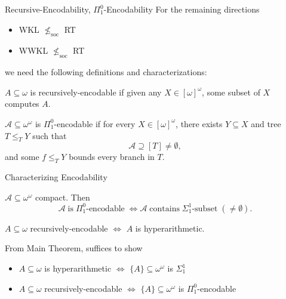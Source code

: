 \begin{frame}{Recursive-Encodability, $\Pi_1^0$-Encodability}
  For the remaining directions
  \begin{itemize}
    \item WKL $\nleq_{\text{soc}}$ RT
    \item WWKL $\nleq_{\text{soc}}$ RT
  \end{itemize}
  we need the following definitions and characterizations:

  \begin{define}
    $A\subseteq\omega$ is recursively-encodable if given any
    $X\in[\omega]^\omega$, some subset of $X$ computes $A$.
  \end{define}

  \begin{define}
    $\mathcal{A}\subseteq \omega^{\omega}$ is $\Pi_1^0$-encodable if for
    every $X\in[\omega]^\omega$, there exists $Y\subseteq X$ and tree
    $T\leq_T Y$ such that
    \[\mathcal{A} \supseteq [T]\neq\emptyset,\]
    and some $f\leq_T Y$ bounds every branch in $T$.
  \end{define}
\end{frame}

\begin{frame}{Characterizing Encodability}
  \begin{main-thm*}
    $\mathcal{A}\subseteq \omega^{\omega}$ compact. Then
    \[\mathcal{A}\; \text{is}\; \Pi_1^0\text{-encodable}\; \Leftrightarrow
    \mathcal{A}\; \text{contains}\; \Sigma_1^1\text{-subset}\;
    (\neq\emptyset).\]
  \end{main-thm*}

  \begin{coro*}
    $A\subseteq\omega$ recursively-encodable $\Leftrightarrow$ $A$ is
    hyperarithmetic.
  \end{coro*}

  \vspace{1em}
  From Main Theorem, suffices to show
  \begin{itemize}
    \item $A\subseteq\omega$ is hyperarithmetic $\Leftrightarrow$
      $\{A\}\subseteq\omega^\omega$ is $\Sigma_1^1$
    \item $A\subseteq\omega$ recursively-encodable $\Leftrightarrow$
      $\{A\}\subseteq\omega^\omega$ is $\Pi_1^0$-encodable
  \end{itemize}
\end{frame}

